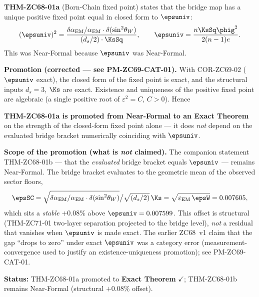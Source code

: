 \documentclass[12pt, a4paper]{article}
\renewcommand{\epsEM}{\varepsilon_{\rm EM}}
\renewcommand{\swsq}{\sin^2\!\theta_W}
\renewcommand{\aEM}{\alpha_{\rm EM}}
\begin{document}

\begin{formalbox}[title={COR-ZC69-03: THM-ZC68-01 Promoted to Exact
  ($R_0/R_{\max}$, Exact)}]

\textbf{THM-ZC68-01a} (Born-Chain fixed point) states that the
bridge map has a unique positive fixed point equal in closed form to
$\epsuniv$:
\[
  (\epsuniv)^{2}
  = \frac{\delta\aEM/\aEM \cdot \delta(\swsq)}{(d_s/2)\cdot\KsSq},
  \qquad
  \epsuniv = \frac{n\KsSq\phig^2}{2(n-1)e}.
\]
This was Near-Formal because $\epsuniv$ was Near-Formal.

\textbf{Promotion (corrected --- see PM-ZC69-CAT-01).}
With COR-ZC69-02 ($\epsuniv$ exact), the closed form of the fixed
point is exact, and the structural inputs $d_s=3$, $\Ks$ are exact.
Existence and uniqueness of the positive fixed point are algebraic
(a single positive root of $\varepsilon^2=C$, $C>0$). Hence

\textbf{THM-ZC68-01a is promoted from Near-Formal to an Exact
Theorem} on the strength of the closed-form fixed point alone --- it
does \emph{not} depend on the evaluated bridge bracket numerically
coinciding with $\epsuniv$.

\textbf{Scope of the promotion (what is \emph{not} claimed).}
The companion statement THM-ZC68-01b --- that the \emph{evaluated}
bridge bracket equals $\epsuniv$ --- remains Near-Formal. The bridge
bracket evaluates to the geometric mean of the observed sector floors,
\[
  \epsSC = \sqrt{\delta\aEM/\aEM \cdot \delta(\swsq)}\big/\sqrt{(d_s/2)}\,\Ks
         = \sqrt{\epsEM\,\epsW} = 0.007605,
\]
which sits a \emph{stable} $+0.08\%$ above $\epsuniv = 0.007599$. This
offset is structural (THM-ZC71-01 two-layer separation projected to the
bridge level), \emph{not} a residual that vanishes when $\epsuniv$ is
made exact. The earlier ZC68~v1 claim that the gap ``drops to zero''
under exact $\epsuniv$ was a category error (measurement-convergence
used to justify an existence-uniqueness promotion); see PM-ZC69-CAT-01.

\textbf{Status:} THM-ZC68-01a promoted to \textbf{Exact Theorem}
$\checkmark$; THM-ZC68-01b remains Near-Formal (structural $+0.08\%$ offset).
\end{formalbox}

\end{document}
